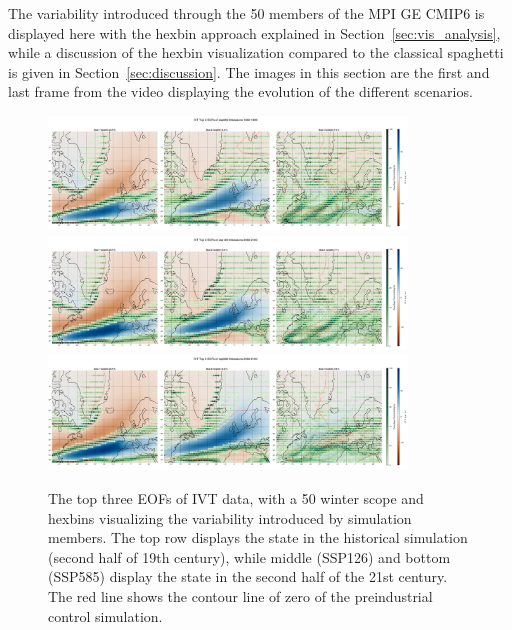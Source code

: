 The variability introduced through the 50 members of the MPI GE CMIP6 is displayed here with the hexbin approach explained in Section~\ref{sec:vis_analysis}, while a discussion of the hexbin visualization compared to the classical spaghetti is given in Section~\ref{sec:discussion}.
The images in this section are the first and last frame from the video displaying the evolution of the different scenarios.  


\begin{figure}[htb]
  \begin{center}
    \includegraphics[width=0.85\textwidth]{figures/ivt_spat_patterns_hexbin_18501899_ssp585_50seasons.png}
    \includegraphics[width=0.85\textwidth]{figures/ivt_spat_patterns_hexbin_20502100_ssp126_50seasons.png}
    \includegraphics[width=0.85\textwidth]{figures/ivt_spat_patterns_hexbin_20502100_ssp585_50seasons.png}
  \end{center}
  \caption{The top three EOFs of IVT data, with a 50 winter scope and hexbins visualizing the variability introduced by simulation members. The top row displays the state in the historical simulation (second half of 19th century), while middle (SSP126) and bottom (SSP585) display the state in the second half of the 21st century. The red line shows the contour line of zero of the preindustrial control simulation. }\label{fig:ivt eof evolution}
\end{figure}

